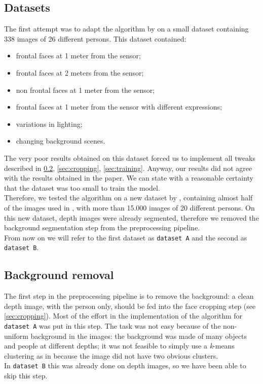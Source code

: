 \documentclass{article}
\begin{document}
\subsection{Datasets}\label{sec:datasets}
The first attempt was to adapt the algorithm by \citet{Hayat2016} on a small dataset containing 338 images of 26 different persons. This dataset contained:
\begin{itemize}
	\item frontal faces at 1 meter from the sensor;
	\item frontal faces at 2 meters from the sensor;
	\item non frontal faces at 1 meter from the sensor;
	\item frontal faces at 1 meter from the sensor with different expressions;
	\item variations in lighting;
	\item changing background scenes.
\end{itemize}
The very poor results obtained on this dataset forced us to implement all tweaks described in \ref{sec:background}, \ref{sec:cropping}, \ref{sec:training}. Anyway, our results did not agree with the results obtained in the paper. We can state with a reasonable certainty that the dataset was too small to train the model. \\
Therefore, we tested the algorithm on a new dataset by \citet{Fanelli2013}, containing almost half of the images used in \citet{Hayat2016}, with more than 15.000 images of 20 different persons. On this new dataset, depth images were already segmented, therefore we removed the background segmentation step from the preprocessing pipeline. \\
From now on we will refer to the first dataset as \verb|dataset A| and the second as \verb|dataset B|.

\subsection{Background removal} \label{sec:background}
The first step in the preprocessing pipeline is to remove the background: a clean depth image, with the person only, should be fed into the face cropping step (see \ref{sec:cropping}). Most of the effort in the implementation of the algorithm for \verb|dataset A| was put in this step. The task was not easy because of the non-uniform background in the images: the background was made of many objects and people at different depths; it was not feasible to simply use a \textit{k}-means clustering as in \cite{Hayat2016} because the image did not have two obvious clusters. \\
In \verb|dataset B| this was already done on depth images, so we have been able to skip this step. \\
\end{document}
